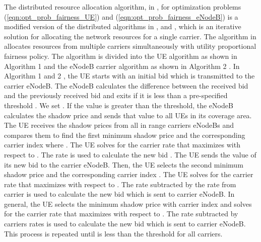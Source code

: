 \documentclass[journal]{IEEEtran} 		\usepackage{amsmath,amssymb}
\begin{document}
The distributed resource allocation algorithm, in \cite{Ahmed_Utility4}, for optimization problems (\ref{eqn:opt_prob_fairness_UE}) and (\ref{eqn:opt_prob_fairness_eNodeB}) is a modified version of the distributed algorithms in \cite{Ahmed_Utility1, Ahmed_Utility2,Ahmed_Utility3}, \cite{kelly98ratecontrol} and \cite{Low99optimizationflow}, which is an iterative solution for allocating the network resources for a single carrier. The algorithm in \cite{Ahmed_Utility4} allocates resources from multiple carriers simultaneously with utility proportional fairness policy. The algorithm is divided into the  UE algorithm as shown in Algorithm 1 \cite{Ahmed_Utility4} and the  eNodeB carrier algorithm as shown in Algorithm 2 \cite{Ahmed_Utility4}. In Algorithm 1 and 2 \cite{Ahmed_Utility4}, the  UE starts with an initial bid  which is transmitted to the  carrier eNodeB. The  eNodeB calculates the difference between the received bid  and the previously
received bid  and exits if it is less than a pre-specified threshold . We set . If the value is greater than the threshold, the  eNodeB calculates the shadow price  and sends that value to all UEs in its coverage area. The  UE receives the shadow prices  from all in range carriers eNodeBs and compares them to find the first minimum shadow price  and the corresponding carrier index  where . The  UE solves for the  carrier rate  that maximizes  with respect to . The rate  is used to calculate the new bid . The  UE sends the value of its new bid  to the  carrier eNodeB. Then, the  UE selects the second minimum shadow price   and the corresponding
carrier index . The  UE solves
for the  carrier rate  that maximizes  with respect to . The rate  subtracted by the rate from  carrier  is used to calculate the new bid  which is sent to  carrier eNodeB. In general, the  UE selects the   minimum shadow price  with carrier index  and solves for the  carrier rate  that maximizes  with respect to . The rate  subtracted by  carriers rates   is used to calculate the new bid  which is sent to  carrier eNodeB. This process is repeated until  is less than the threshold  for all 
carriers.
\end{document}
